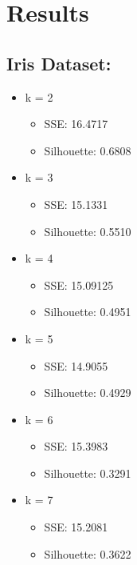 \documentclass{article}
\begin{document}
\section{Results}
\subsection{Iris Dataset:}
\begin{itemize}

    \item{k = 2}
        \begin{itemize}
            \item SSE: 16.4717
            \item Silhouette: 0.6808
        \end{itemize}
        
    \item{k = 3}
        \begin{itemize}
            \item SSE: 15.1331
            \item Silhouette: 0.5510
        \end{itemize}
        
    \item{k = 4}
        \begin{itemize}
            \item SSE: 15.09125
            \item Silhouette: 0.4951
        \end{itemize}
        
    \item{k = 5}
        \begin{itemize}
            \item SSE: 14.9055
            \item Silhouette: 0.4929
        \end{itemize}
        
    \item{k = 6}
        \begin{itemize}
            \item SSE: 15.3983
            \item Silhouette: 0.3291
        \end{itemize}
        
    \item{k = 7}
        \begin{itemize}
            \item SSE: 15.2081
            \item Silhouette: 0.3622
        \end{itemize}
        

\end{itemize}
\end{document}
